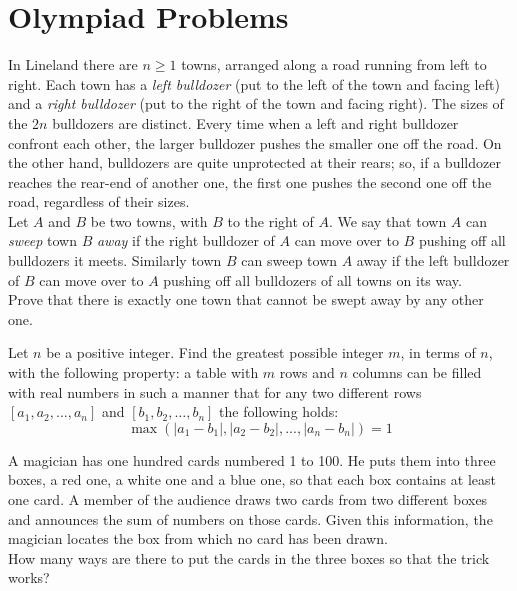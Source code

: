 \documentclass{article}
\begin{document}
\section{Olympiad Problems}
\begin{prob}[Shortlist 2015 C1]{6}
In Lineland there are $n\geq1$ towns, arranged along a road running from left to right. Each town has a \textit{left bulldozer} (put to the left of the town and facing left) and a \textit{right bulldozer} (put to the right of the town and facing right). The sizes of the $2n$ bulldozers are distinct. Every time when a left and right bulldozer confront each other, the larger bulldozer pushes the smaller one off the road. On the other hand, bulldozers are quite unprotected at their rears; so, if a bulldozer reaches the rear-end of another one, the first one pushes the second one off the road, regardless of their sizes.\\[1\baselineskip]Let $A$ and $B$ be two towns, with $B$ to the right of $A$. We say that town $A$ can \textit{sweep} town $B$ \textit{away} if the right bulldozer of $A$ can move over to $B$ pushing off all bulldozers it meets. Similarly town $B$ can sweep town $A$ away if the left bulldozer of $B$ can move over to $A$ pushing off all bulldozers of all towns on its way.\\[1\baselineskip]Prove that there is exactly one town that cannot be swept away by any other one.
\end{prob}

\begin{prob}[EGMO 2012/2]{6}
Let $n$ be a positive integer. Find the greatest possible integer $m$, in terms of $n$, with the following property: a table with $m$ rows and $n$ columns can be filled with real numbers in such a manner that for any two different rows $\left[ {{a_1},{a_2},\ldots,{a_n}}\right]$ and $\left[ {{b_1},{b_2},\ldots,{b_n}} \right]$ the following holds: \[\max\left( {\left| {{a_1} - {b_1}} \right|,\left| {{a_2} - {b_2}} \right|,...,\left| {{a_n} - {b_n}} \right|} \right) = 1\]
\end{prob}

\begin{prob}[IMO 2000/4]{9}
A magician has one hundred cards numbered 1 to 100. He puts them into three boxes, a red one, a white one and a blue one, so that each box contains at least one card. A member of the audience draws two cards from two different boxes and announces the sum of numbers on those cards. Given this information, the magician locates the box from which no card has been drawn.\\[1\baselineskip]How many ways are there to put the cards in the three boxes so that the trick works?
\end{prob}
\end{document}
